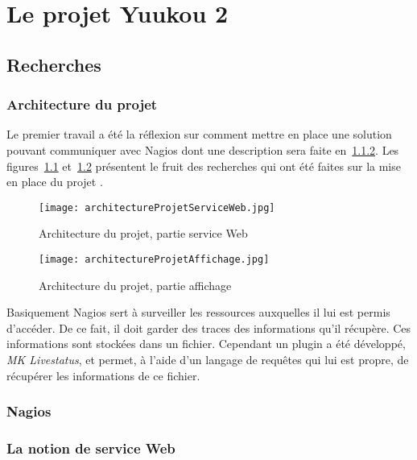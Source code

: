 \chapter{Le projet Yuukou 2}

\section{Recherches}

\subsection{Architecture du projet}

Le premier travail a \'et\'e la r\'eflexion sur comment mettre en place une solution pouvant communiquer avec Nagios dont une description sera faite en~\ref{section:nagios}.
Les figures~\ref{figure:architectureProjetServiceWeb} et~\ref{figure:architectureProjetAffichage} pr\'esentent le fruit des recherches qui ont \'et\'e faites sur la mise en place du projet \YuukouII.

\begin{figure}[!ht]
	\centering
	\texttt{[image: architectureProjetServiceWeb.jpg]}
	\caption{Architecture du projet, partie service Web}
	\label{figure:architectureProjetServiceWeb}

\end{figure}

\begin{figure}[!ht]
	\centering
	\texttt{[image: architectureProjetAffichage.jpg]}
	\caption{Architecture du projet, partie affichage}
	\label{figure:architectureProjetAffichage}

\end{figure}

Basiquement Nagios sert \`a surveiller les ressources auxquelles il lui est permis d'acc\'eder.
De ce fait, il doit garder des traces des informations qu'il r\'ecup\`ere.
Ces informations sont stock\'ees dans un fichier.
Cependant un plugin a \'et\'e d\'evelopp\'e, \textit{MK Livestatus}, et permet, \`a l'aide d'un langage de requ\^etes qui lui est propre, de r\'ecup\'erer les informations de ce fichier.



\subsection{Nagios}
\label{section:nagios}

\subsection{La notion de service Web}
\label{section:serviceWeb}

